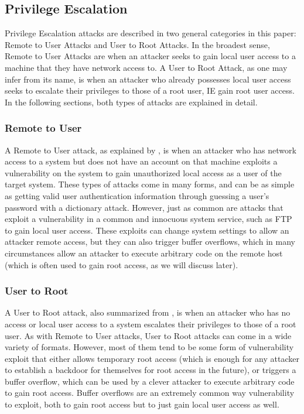 \documentclass{acm_proc_article-sp}
\begin{document}
    \subsection{Privilege Escalation} %
    	Privilege Escalation attacks are described in two general categories in this paper: Remote to User Attacks and User to Root Attacks. In the broadest sense, Remote to User Attacks are when an attacker seeks to gain local user access to a machine that they have network access to. A User to Root Attack, as one may infer from its name, is when an attacker who already possesses local user access seeks to escalate their privileges to those of a root user, IE gain root user access. In the following sections, both types of attacks are explained in detail.
    \subsubsection{Remote to User}
    	A Remote to User attack, as explained by \cite{Labs1999}, is when an attacker who has network access to a system but does not have an account on that machine exploits a vulnerability on the system to gain unauthorized local access as a user of the target system. These types of attacks come in many forms, and can be as simple as getting valid user authentication information through guessing a user's password with a dictionary attack. However, just as common are attacks that exploit a vulnerability in a common and innocuous system service, such as FTP to gain local user access. These exploits can change system settings to allow an attacker remote access, but they can also trigger buffer overflows, which in many circumstances allow an attacker to execute arbitrary code on the remote host (which is often used to gain root access, as we will discuss later). 
    \subsubsection{User to Root}
     	A User to Root attack, also summarized from \cite{Labs1999}, is when an attacker who has no access or local user access to a system escalates their privileges to those of a root user. As with Remote to User attacks, User to Root attacks can come in a wide variety of formats. However, most of them tend to be some form of vulnerability exploit that either allows temporary root access (which is enough for any attacker to establish a backdoor for themselves for root access in the future), or triggers a buffer overflow, which can be used by a clever attacker to execute arbitrary code to gain root access. Buffer overflows are an extremely common way vulnerability to exploit, both to gain root access but to just gain local user access as well.
\end{document}
